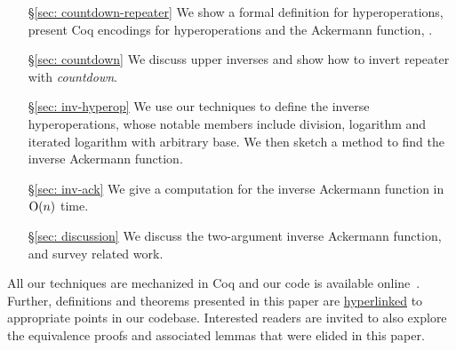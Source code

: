 \begin{itemize}
	\item[\S\ref{sec: countdown-repeater}] We show a formal definition for hyperoperations, present Coq encodings for hyperoperations and the Ackermann function, .
	\item[\S\ref{sec: countdown}] We discuss upper inverses and show how to invert repeater with \emph{countdown}.
	\item[\S\ref{sec: inv-hyperop}] We use our techniques to define the inverse hyperoperations, whose notable members include division, logarithm and iterated logarithm with arbitrary base. We then sketch a method to find the inverse Ackermann function.
	\item[\S\ref{sec: inv-ack}] We give a computation for the inverse Ackermann function in $\text{O}(n)$ time.
	\item[\S\ref{sec: discussion}] We discuss the two-argument inverse Ackermann function,  and survey related work.
\end{itemize}
All our techniques are mechanized in Coq and our code is available 
online~\cite{inv-ack}. Further, definitions and theorems presented 
in this paper are \href{https://github.com/inv-ack/inv-ack}{hyperlinked} 
to appropriate points in our codebase. Interested readers are invited to also
explore the equivalence proofs and associated lemmas that were elided in this paper.

